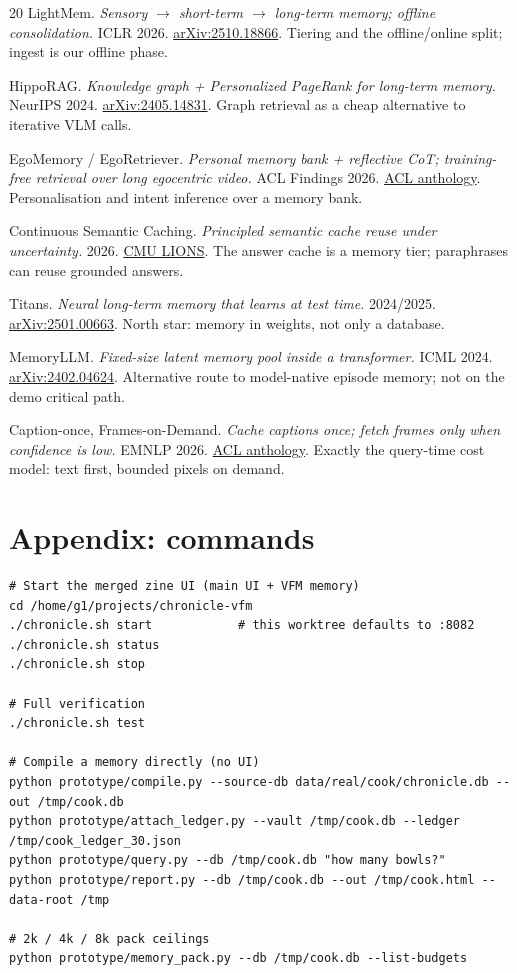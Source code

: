 \documentclass[10pt,a4paper]{article}
\begin{document}
\begin{thebibliography}{20}
 LightMem. \emph{Sensory $\to$ short-term $\to$ long-term memory; offline
consolidation.} ICLR 2026. \href{https://arxiv.org/abs/2510.18866}{arXiv:2510.18866}.
Tiering and the offline/online split; ingest is our offline phase.

 HippoRAG. \emph{Knowledge graph + Personalized PageRank for long-term memory.}
NeurIPS 2024. \href{https://arxiv.org/abs/2405.14831}{arXiv:2405.14831}.
Graph retrieval as a cheap alternative to iterative VLM calls.

 EgoMemory / EgoRetriever. \emph{Personal memory bank + reflective CoT;
training-free retrieval over long egocentric video.} ACL Findings 2026.
\href{https://aclanthology.org/2026.findings-acl.362.pdf}{ACL anthology}.
Personalisation and intent inference over a memory bank.

 Continuous Semantic Caching. \emph{Principled semantic cache reuse under
uncertainty.} 2026.
\href{https://research.ece.cmu.edu/lions/Papers/Semantic_LLM_Caching.pdf}{CMU LIONS}.
The answer cache is a memory tier; paraphrases can reuse grounded answers.

 Titans. \emph{Neural long-term memory that learns at test time.} 2024/2025.
\href{https://arxiv.org/abs/2501.00663}{arXiv:2501.00663}.
North star: memory in weights, not only a database.

 MemoryLLM. \emph{Fixed-size latent memory pool inside a transformer.}
ICML 2024. \href{https://arxiv.org/abs/2402.04624}{arXiv:2402.04624}.
Alternative route to model-native episode memory; not on the demo critical path.

 Caption-once, Frames-on-Demand. \emph{Cache captions once; fetch frames only
when confidence is low.} EMNLP 2026.
\href{https://aclanthology.org/2026.emnlp-main.422.pdf}{ACL anthology}.
Exactly the query-time cost model: text first, bounded pixels on demand.

\end{thebibliography}

\section*{Appendix: commands}

\begin{verbatim}
# Start the merged zine UI (main UI + VFM memory)
cd /home/g1/projects/chronicle-vfm
./chronicle.sh start            # this worktree defaults to :8082
./chronicle.sh status
./chronicle.sh stop

# Full verification
./chronicle.sh test

# Compile a memory directly (no UI)
python prototype/compile.py --source-db data/real/cook/chronicle.db --out /tmp/cook.db
python prototype/attach_ledger.py --vault /tmp/cook.db --ledger /tmp/cook_ledger_30.json
python prototype/query.py --db /tmp/cook.db "how many bowls?"
python prototype/report.py --db /tmp/cook.db --out /tmp/cook.html --data-root /tmp

# 2k / 4k / 8k pack ceilings
python prototype/memory_pack.py --db /tmp/cook.db --list-budgets
\end{verbatim}
\end{document}
